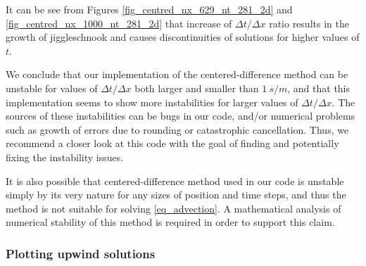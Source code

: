 It can be see from Figures \ref{fig_centred_nx_629_nt_281_2d} and \ref{fig_centred_nx_1000_nt_281_2d} that increase of $\Delta t / \Delta x$ ratio results in the growth of jiggleschnook and causes discontinuities of solutions for higher values of $t$.

We conclude that our implementation of the centered-difference method can be unstable for values of $\Delta t / \Delta x$ both larger and smaller than $1 \ s/m$, and that this implementation seems to show more instabilities for larger values of $\Delta t / \Delta x$. The sources of these instabilities can be bugs in our code, and/or numerical problems such as growth of errors due to rounding or catastrophic cancellation. Thus, we recommend a closer look at this code with the goal of finding and potentially fixing the instability issues.

It is also possible that centered-difference method used in our code is unstable simply by its very nature for any sizes of position and time steps, and thus the method is not suitable for solving \autoref{eq_advection}. A mathematical analysis of numerical stability of this method is required in order to support this claim.


\subsubsection{Plotting upwind solutions}

